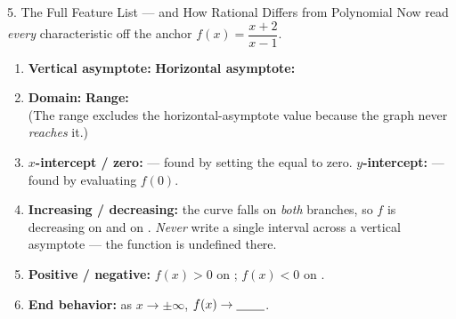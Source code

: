 \documentclass[10pt]{article}
\newcommand{\lgrid}[4]{%
  \draw[step=1, linegray!40, very thin] (#1,#3) grid (#2,#4);
  \draw[->, semithick, charcoal] (#1,0)--(#2,0) node[below right, font=\scriptsize]{$x$};
  \draw[->, semithick, charcoal] (0,#3)--(0,#4) node[left, font=\scriptsize]{$y$};}
\begin{document}
\begin{notesbox}{5. The Full Feature List --- and How Rational Differs from Polynomial}
Now read \emph{every} characteristic off the anchor $f(x)=\dfrac{x+2}{x-1}$.
\begin{center}
\end{center}
\begin{enumerate}[leftmargin=1.7em, itemsep=3pt]
  \item \textbf{Vertical asymptote:} \blank{1.8cm} \quad \textbf{Horizontal asymptote:}
        \blank{1.8cm}
  \item \textbf{Domain:} \blank{5.0cm} \quad \textbf{Range:} \blank{5.0cm} \\
        (The range excludes the horizontal-asymptote value because the graph never \emph{reaches}
        it.)
  \item \textbf{$x$-intercept / zero:} \blank{1.8cm} --- found by setting the \blank{2.4cm} equal to
        zero. \quad \textbf{$y$-intercept:} \blank{1.8cm} --- found by evaluating $f(0)$.
  \item \textbf{Increasing / decreasing:} the curve falls on \emph{both} branches, so $f$ is
        decreasing on \blank{2.6cm} and on \blank{2.6cm}. \emph{Never} write a single interval
        across a vertical asymptote --- the function is undefined there.
  \item \textbf{Positive / negative:} $f(x)>0$ on \blank{4.4cm}; \quad $f(x)<0$ on \blank{2.4cm}.
  \item \textbf{End behavior:} as $x\to\pm\infty$, $f(x)\to\blank{0.8cm}$.
\end{enumerate}


\end{notesbox}
\end{document}
